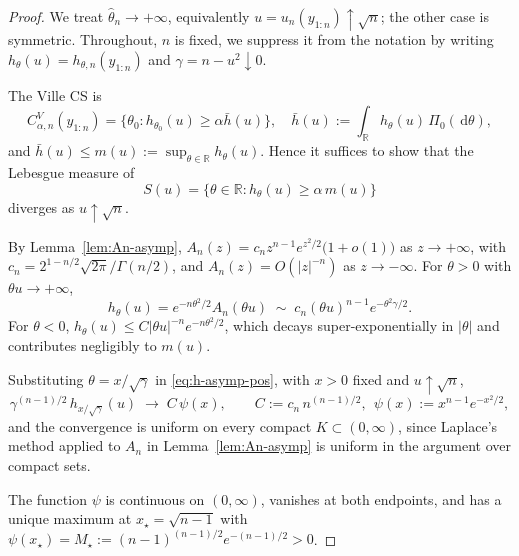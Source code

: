 \documentclass[12pt, a4paper]{report}
\newcommand{\dd}{\,\mathrm{d}}
\newcommand{\1}{\mathbf{1}}
\begin{document}
\begin{proof}
    We treat $\widehat\theta_n \to +\infty$, equivalently $u = u_n(y_{1:n})
\uparrow \sqrt n$; the other case is symmetric. Throughout, $n$ is fixed, we suppress it from the notation by writing $h_\theta(u) = h_{\theta,n}(y_{1:n})$ and $\gamma = n - u^2 \downarrow 0$.

The Ville CS is
\[
  C_{\alpha,n}^V(y_{1:n}) = \bigl\{\theta_0 : h_{\theta_0}(u) \geq \alpha
  \bar h(u)\bigr\}, \quad \bar h(u) := \int_\mathbb{R} h_\theta(u)\,\Pi_0(\dd\theta),
\]
and $\bar h(u) \leq m(u) := \sup_{\theta\in\mathbb{R}}h_\theta(u)$. Hence it
suffices to show that the Lebesgue measure of
\[
  S(u) = \{\theta\in\mathbb{R} : h_\theta(u) \geq \alpha\,m(u)\}
\]
diverges as $u\uparrow\sqrt n$.

By Lemma~\ref{lem:An-asymp}, $A_n(z) = c_n z^{n-1}e^{z^2/2}\bigl(1+o(1)\bigr)$
as $z\to+\infty$, with $c_n = 2^{1-n/2}\sqrt{2\pi}/\Gamma(n/2)$, and
$A_n(z) = O(|z|^{-n})$ as $z\to-\infty$. For $\theta > 0$ with
$\theta u \to +\infty$,
\begin{equation}\label{eq:h-asymp-pos}
  h_\theta(u) = e^{-n\theta^2/2}A_n(\theta u)
  \;\sim\; c_n(\theta u)^{n-1}e^{-\theta^2\gamma/2}.
\end{equation}
For $\theta < 0$, $h_\theta(u) \leq C|\theta u|^{-n}e^{-n\theta^2/2}$,
which decays super-exponentially in $|\theta|$ and contributes
negligibly to $m(u)$.

Substituting $\theta = x/\sqrt\gamma$ in \eqref{eq:h-asymp-pos}, with
$x > 0$ fixed and $u\uparrow\sqrt n$,
\begin{equation}\label{eq:rescaled-limit}
  \gamma^{(n-1)/2}\,h_{x/\sqrt\gamma}(u)
  \;\longrightarrow\; C\,\psi(x),
  \qquad C := c_n\,n^{(n-1)/2},\ \ \psi(x) := x^{n-1}e^{-x^2/2},
\end{equation}
and the convergence is uniform on every compact $K \subset (0,\infty)$,
since Laplace's method applied to $A_n$ in Lemma~\ref{lem:An-asymp} is
uniform in the argument over compact sets.

The function $\psi$ is continuous on $(0,\infty)$, vanishes at both
endpoints, and has a unique maximum at $x_\star = \sqrt{n-1}$ with
$\psi(x_\star) = M_\star := (n-1)^{(n-1)/2}e^{-(n-1)/2} > 0$.


\end{proof}
\end{document}
